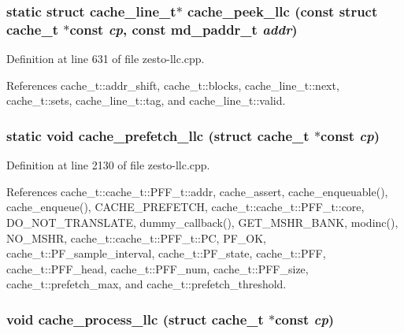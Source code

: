 \subsubsection[{cache\_\-peek\_\-llc}]{\setlength{\rightskip}{0pt plus 5cm}static struct {\bf cache\_\-line\_\-t}$\ast$ cache\_\-peek\_\-llc (const struct {\bf cache\_\-t} $\ast$const  {\em cp}, \/  const {\bf md\_\-paddr\_\-t} {\em addr})\hspace{0.3cm}{\tt  [static, read]}}\label{zesto-llc_8cpp_955da6a438bbb3f390d758f2f75fa822}




Definition at line 631 of file zesto-llc.cpp.

References cache\_\-t::addr\_\-shift, cache\_\-t::blocks, cache\_\-line\_\-t::next, cache\_\-t::sets, cache\_\-line\_\-t::tag, and cache\_\-line\_\-t::valid.
\subsubsection[{cache\_\-prefetch\_\-llc}]{\setlength{\rightskip}{0pt plus 5cm}static void cache\_\-prefetch\_\-llc (struct {\bf cache\_\-t} $\ast$const  {\em cp})\hspace{0.3cm}{\tt  [static]}}\label{zesto-llc_8cpp_0bb0f060c77b60c70dce0eee1abb237a}




Definition at line 2130 of file zesto-llc.cpp.

References cache\_\-t::cache\_\-t::PFF\_\-t::addr, cache\_\-assert, cache\_\-enqueuable(), cache\_\-enqueue(), CACHE\_\-PREFETCH, cache\_\-t::cache\_\-t::PFF\_\-t::core, DO\_\-NOT\_\-TRANSLATE, dummy\_\-callback(), GET\_\-MSHR\_\-BANK, modinc(), NO\_\-MSHR, cache\_\-t::cache\_\-t::PFF\_\-t::PC, PF\_\-OK, cache\_\-t::PF\_\-sample\_\-interval, cache\_\-t::PF\_\-state, cache\_\-t::PFF, cache\_\-t::PFF\_\-head, cache\_\-t::PFF\_\-num, cache\_\-t::PFF\_\-size, cache\_\-t::prefetch\_\-max, and cache\_\-t::prefetch\_\-threshold.
\subsubsection[{cache\_\-process\_\-llc}]{\setlength{\rightskip}{0pt plus 5cm}void cache\_\-process\_\-llc (struct {\bf cache\_\-t} $\ast$const  {\em cp})}\label{zesto-llc_8cpp_7b2967a29a17913e313fceec0d9dbd4c}




